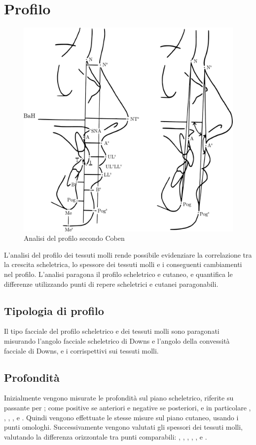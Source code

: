 \section{Profilo}

\begin{figure}
\centering
\includegraphics[width=.6\columnwidth]{./images/coben_profilo.pdf}
\caption{Analisi del profilo secondo Coben}
\label{fig:coben_profilo}
\end{figure}

L'analisi del profilo dei tessuti molli rende possibile evidenziare la correlazione tra la crescita scheletrica, lo spessore dei tessuti molli e i conseguenti cambiamenti nel profilo. L'analisi paragona il profilo scheletrico e cutaneo, e quantifica le differenze utilizzando punti di repere scheletrici e cutanei paragonabili.
\subsection*{Tipologia di profilo}
Il tipo facciale del profilo scheletrico e dei tessuti molli  sono paragonati misurando l'angolo facciale scheletrico di Downs e l'angolo della convessità facciale di Downs, e i corrispettivi sui tessuti molli.
\subsection*{Profondità}
Inizialmente vengono misurate le profondità sul piano scheletrico, riferite su  passante per ; come positive se anteriori e negative se posteriori, e in particolare , , , ,  e . Quindi vengono effettuate le stesse misure sul piano cutaneo, usando i punti omologhi. Successivamente vengono valutati gli spessori dei tessuti molli, valutando la differenza orizzontale tra punti comparabili: , , , , ,  e .
